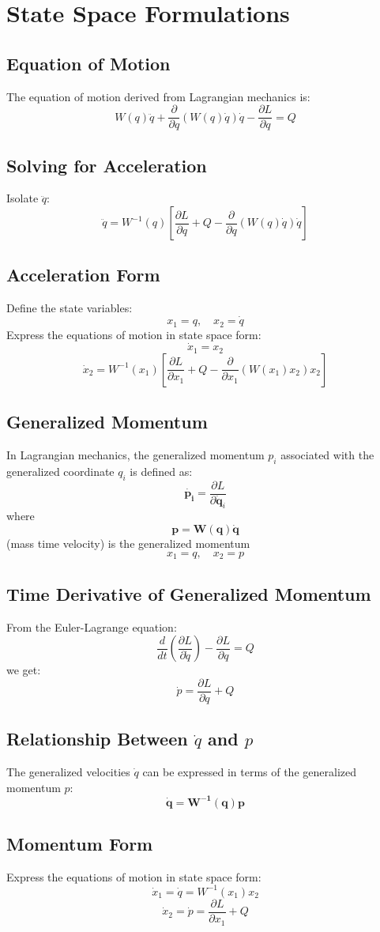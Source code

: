 \section{State Space Formulations}

\subsection{Equation of Motion}
The equation of motion derived from Lagrangian mechanics is:
\[
W(q) \ddot{q} + \frac{\partial}{\partial q} (W(q) \dot{q}) \dot{q} - \frac{\partial L}{\partial q} = Q
\]


\subsection{Solving for Acceleration}
Isolate \(\ddot{q}\):
\[
\ddot{q} = W^{-1}(q) \left[ \frac{\partial L}{\partial q} + Q - \frac{\partial}{\partial q} (W(q) \dot{q}) \dot{q} \right]
\]

\subsection{Acceleration Form}
Define the state variables:
\[
x_1 = q, \quad x_2 = \dot{q}
\]
Express the equations of motion in state space form:
\[
\dot{x}_1 = x_2
\]
\[
\dot{x}_2 = W^{-1}(x_1) \left[ \frac{\partial L}{\partial x_1} + Q - \frac{\partial}{\partial x_1} (W(x_1) x_2) x_2 \right]
\]


\subsection{Generalized Momentum}
In Lagrangian mechanics, the generalized momentum \( p_i \) associated with the generalized coordinate \( q_i \) is defined as:
\[
\dot{\mathbf{p_i}} = \frac{\partial L}{\partial \dot{\mathbf{q}}_i} 
\]
where 
\[
\mathbf{p} = \mathbf{W}(\mathbf{q})\dot{\mathbf{q}}
\]
(mass time velocity) is the generalized momentum
\[
x_1 = q, \quad x_2 = p
\]
\subsection{Time Derivative of Generalized Momentum}
From the Euler-Lagrange equation:
\[
\frac{d}{dt} \left( \frac{\partial L}{\partial \dot{q}} \right) - \frac{\partial L}{\partial q} = Q
\]
we get:
\[
\dot{p} = \frac{\partial L}{\partial q} + Q
\]


\subsection{Relationship Between \(\dot{q}\) and \( p \)}
The generalized velocities \(\dot{q}\) can be expressed in terms of the generalized momentum \( p \):
\[
\dot{\mathbf{q}} = \mathbf{W^{-1}(q) p}
\]


\subsection{Momentum Form}
Express the equations of motion in state space form:
\[
\dot{x}_1 = \dot{q} = W^{-1}(x_1) x_2
\]
\[
\dot{x}_2 = \dot{p} = \frac{\partial L}{\partial x_1} + Q 
\]
